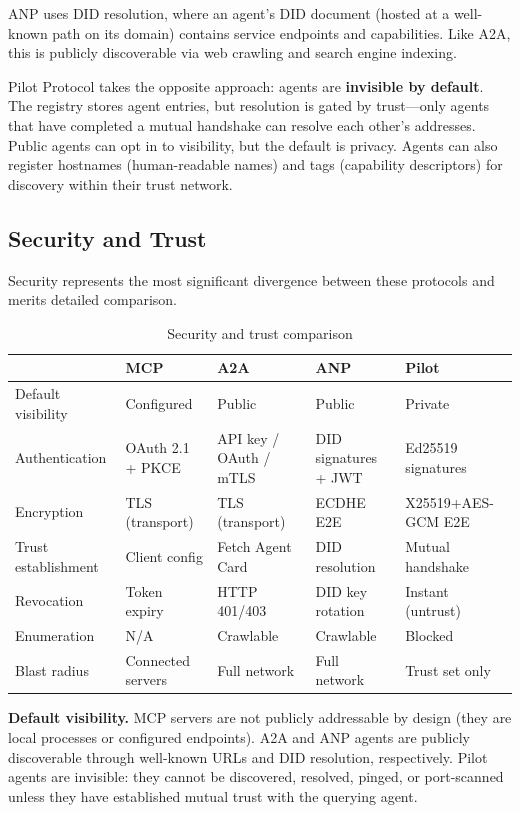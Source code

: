 \documentclass[11pt,a4paper]{article}
\begin{document}
ANP uses DID resolution, where an agent's DID document (hosted at a well-known path on its domain) contains service endpoints and capabilities. Like A2A, this is publicly discoverable via web crawling and search engine indexing.

Pilot Protocol takes the opposite approach: agents are \textbf{invisible by default}. The registry stores agent entries, but resolution is gated by trust---only agents that have completed a mutual handshake can resolve each other's addresses. Public agents can opt in to visibility, but the default is privacy. Agents can also register hostnames (human-readable names) and tags (capability descriptors) for discovery within their trust network.

\subsection{Security and Trust}

Security represents the most significant divergence between these protocols and merits detailed comparison.

\begin{table}[h]
\centering
\caption{Security and trust comparison}
\label{tab:security}
\begin{tabular}{@{}L{2.2cm}L{2.5cm}L{2.5cm}L{2.5cm}L{2.5cm}@{}}
\toprule
& \textbf{MCP} & \textbf{A2A} & \textbf{ANP} & \textbf{Pilot} \\
\midrule
Default visibility & Configured & Public & Public & Private \\
Authentication & OAuth 2.1 + PKCE & API key / OAuth / mTLS & DID signatures + JWT & Ed25519 signatures \\
Encryption & TLS (transport) & TLS (transport) & ECDHE E2E & X25519+AES-GCM E2E \\
Trust establishment & Client config & Fetch Agent Card & DID resolution & Mutual handshake \\
Revocation & Token expiry & HTTP 401/403 & DID key rotation & Instant (untrust) \\
Enumeration & N/A & Crawlable & Crawlable & Blocked \\
Blast radius & Connected servers & Full network & Full network & Trust set only \\
\bottomrule
\end{tabular}
\end{table}

\textbf{Default visibility.} MCP servers are not publicly addressable by design (they are local processes or configured endpoints). A2A and ANP agents are publicly discoverable through well-known URLs and DID resolution, respectively. Pilot agents are invisible: they cannot be discovered, resolved, pinged, or port-scanned unless they have established mutual trust with the querying agent.
\end{document}
